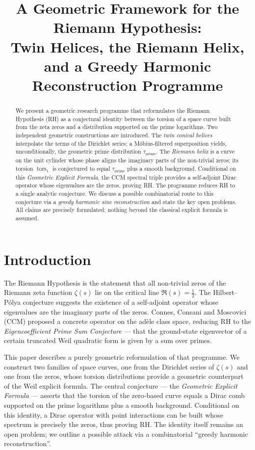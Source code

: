 \documentclass[11pt,a4paper]{article}
\title{A Geometric Framework for the Riemann Hypothesis:\\ Twin Helices, the Riemann Helix, and a Greedy Harmonic Reconstruction Programme}
\author{}
\date{}
\newcommand{\tors}{\operatorname{tors}}
\begin{document}
\maketitle

\begin{abstract}
We present a geometric research programme that reformulates the Riemann Hypothesis (RH) as a conjectural identity between the torsion of a space curve built from the zeta zeros and a distribution supported on the prime logarithms.  Two independent geometric constructions are introduced.  The \emph{twin conical helices} interpolate the terms of the Dirichlet series; a M\"obius‑filtered superposition yields, unconditionally, the geometric prime distribution \(\tau_{\text{prime}}\).  The \emph{Riemann helix} is a curve on the unit cylinder whose phase aligns the imaginary parts of the non‑trivial zeros; its torsion \(\tors_1\) is conjectured to equal \(\tau_{\text{prime}}\) plus a smooth background.  Conditional on this \emph{Geometric Explicit Formula}, the CCM spectral triple provides a self‑adjoint Dirac operator whose eigenvalues are the zeros, proving RH.  The programme reduces RH to a single analytic conjecture.  We discuss a possible combinatorial route to this conjecture via a \emph{greedy harmonic sine reconstruction} and state the key open problems.  All claims are precisely formulated; nothing beyond the classical explicit formula is assumed.
\end{abstract}

\section{Introduction}

The Riemann Hypothesis is the statement that all non‑trivial zeros of the Riemann zeta function \(\zeta(s)\) lie on the critical line \(\Re(s)=\frac12\).  The Hilbert–P\'olya conjecture suggests the existence of a self‑adjoint operator whose eigenvalues are the imaginary parts of the zeros.  Connes, Consani and Moscovici (CCM) \cite{CCM} proposed a concrete operator on the adèle class space, reducing RH to the \emph{Eigencoefficient Prime Sum Conjecture} --- that the ground‑state eigenvector of a certain truncated Weil quadratic form is given by a sum over primes.

This paper describes a purely geometric reformulation of that programme.  We construct two families of space curves, one from the Dirichlet series of \(\zeta(s)\) and one from the zeros, whose torsion distributions provide a geometric counterpart of the Weil explicit formula.  The central conjecture --- the \emph{Geometric Explicit Formula} --- asserts that the torsion of the zero‑based curve equals a Dirac comb supported on the prime logarithms plus a smooth background.  Conditional on this identity, a Dirac operator with point interactions can be built whose spectrum is precisely the zeros, thus proving RH.  The identity itself remains an open problem; we outline a possible attack via a combinatorial ``greedy harmonic reconstruction''.
\end{document}
